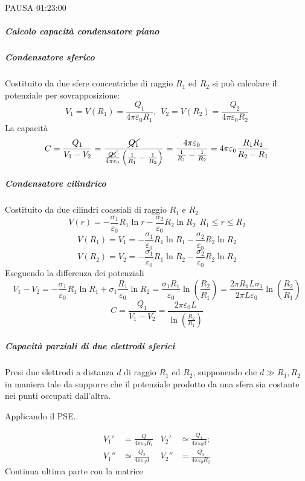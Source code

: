 PAUSA 01:23:00

\subparagraph{Calcolo capacità condensatore piano}


\subparagraph{Condensatore sferico}
Costituito da due sfere concentriche di raggio $R_1$ ed $R_2$
si può calcolare il potenziale per sovrapposizione:
$$
V_1 = V(R_1) = \frac{Q_1}{4\pi \varepsilon_0 R_1},\ \ V_2 = V(R_2) = \frac{Q_2}{4 \pi \varepsilon_0 R_2}
$$
La capacità
$$
C = \frac{Q_1}{V_1 - V_2} = \frac{\cancel{Q_1}}{\frac{\cancel{Q_1}}{4 \pi \varepsilon_0}\left(\frac{1}{R_1}-\frac{1}{R_2}\right)} = \frac{4 \pi \varepsilon_0}{\frac{1}{R_1}-\frac{1}{R_2}} = 4 \pi \varepsilon_0 \frac{R_1 R_2}{R_2 - R_1}
$$

\subparagraph{Condensatore cilindrico}
Costituito da due cilindri coassiali di raggio $R_1$ e $R_2$
$$
V(r) = -\frac{\sigma_1}{\varepsilon_0}R_1 \ln r - \frac{\sigma_2}{\varepsilon_0}R_2 \ln R_2\ \ R_1\leq r \leq R_2
$$
$$
V(R_1) = V_1 = -\frac{\sigma_1}{\varepsilon_0} R_1 \ln R_1 - \frac{\sigma_2}{\varepsilon_0}R_2 \ln R_2
$$
$$
V(R_2) = V_2 = -\frac{\sigma_1}{\varepsilon_0} R_1 \ln R_2 - \frac{\sigma_2}{\varepsilon_0}R_2 \ln R_2
$$
Eseguendo la differenza dei potenziali
$$
V_1 - V_2 = -\frac{\sigma_1}{\varepsilon_0} R_1 \ln R_1 + \sigma_1\frac{R_1}{\varepsilon_0}\ln R_2
= \frac{\sigma_1 R_1}{\varepsilon_0}\ln\left(\frac{R_2}{R_1}\right) = \frac{2 \pi R_1 L \sigma_1}{2 \pi L \varepsilon_0}\ln \left(\frac{R_2}{R_1}\right)
$$
$$
C = \frac{Q_1}{V_1-V_2} = \frac{2 \pi \varepsilon_0 L }{\ln \left(\frac{R_2}{R_1}\right)}
$$

\subparagraph{Capacità parziali di due elettrodi sferici}
Presi due elettrodi a distanza $d$ di raggio $R_1$ ed $R_2$, supponendo che $d \gg R_1,R_2$
in maniera tale da supporre che il potenziale prodotto da una sfera sia costante nei punti 
occupati dall'altra.

Applicando il PSE..

\begin{align*}
V_1' &= \frac{Q}{4 \pi \varepsilon_0 R_1}& V_2' &\simeq \frac{Q_1}{4 \pi \varepsilon_0 d};\\
V_1'' &\simeq \frac{Q_2}{4 \pi \varepsilon_0 d}& V_2'' &= \frac{Q_2}{4 \pi \varepsilon_0 R_2}
\end{align*}
Continua ultima parte con la matrice

